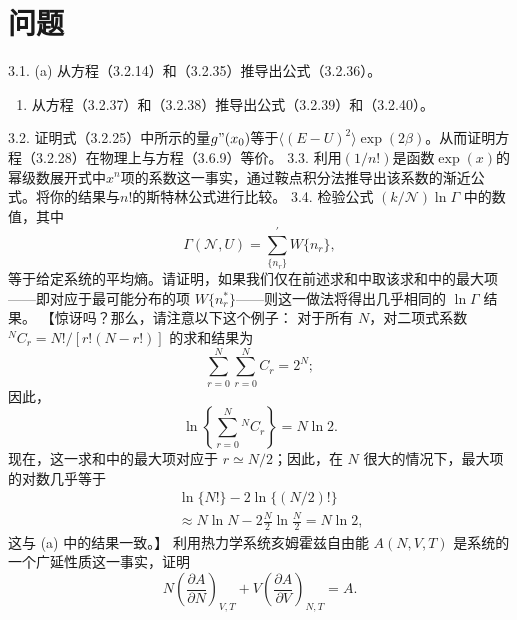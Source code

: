 \section{问题}\label{ux95eeux9898_chap3}
3.1. (a) 从方程（3.2.14）和（3.2.35）推导出公式（3.2.36）。
\begin{enumerate}
\def\labelenumi{(\alph{enumi})}
\setcounter{enumi}{1}
\item
  从方程（3.2.37）和（3.2.38）推导出公式（3.2.39）和（3.2.40）。
\end{enumerate}
3.2. 证明式（3.2.25）中所示的量\(g"(x_0)\)等于\(\langle (E-U)^2 \rangle \exp(2\beta)\)。从而证明方程（3.2.28）在物理上与方程（3.6.9）等价。
3.3. 利用\((1/n!)\)是函数\(\exp(x)\)的幂级数展开式中\(x^n\)项的系数这一事实，通过鞍点积分法推导出该系数的渐近公式。将你的结果与\(n!\)的斯特林公式进行比较。
3.4. 检验公式 \((k/\mathcal{N})\ln\Gamma\) 中的数值，其中
\begin{equation}\tag{3.5.117}\label{eq:3.5.117}
\Gamma ( \mathcal { N } , U ) = \sum _ { \{ n _ { r } \} } ^{\prime} W \{ n _ { r } \} ,
\end{equation}
等于给定系统的平均熵。请证明，如果我们仅在前述求和中取该求和中的最大项——即对应于最可能分布的项 \(W\{n_r^*\}\)——则这一做法将得出几乎相同的 \(\ln\Gamma\) 结果。
【惊讶吗？那么，请注意以下这个例子：
对于所有 \(N\)，对二项式系数 \(^{N}C_{r}=N!/[r!(N-r!)]\) 的求和结果为
\begin{equation}\tag{3.5.118}\label{eq:3.5.118}
\sum _ { r = 0 } ^{N} \sum _ { r = 0 } ^{N} C _ { r } = 2 ^{N} ;
\end{equation}
因此，
\begin{equation}\tag{3.5.119}\label{eq:3.5.119}
\ln \left\{ \sum _ { r = 0 } ^{N} { } ^{N} C _ { r } \right\} = N \ln 2 .
\end{equation}
现在，这一求和中的最大项对应于 \(r \simeq N/2\)；因此，在 \(N\) 很大的情况下，最大项的对数几乎等于
\begin{equation}\tag{3.5.120}\label{eq:3.5.120}
\begin{array}{rlr} & { } & { \ln \{ N ! \} - 2 \ln \{ ( N / 2 ) ! \} } \\& { } & { \approx N \ln N - 2 \frac { N } { 2 } \ln \frac { N } { 2 } = N \ln 2 , } \end{array}
\end{equation}
这与 (a) 中的结果一致。】
利用热力学系统亥姆霍兹自由能 \(A(N,V,T)\) 是系统的一个广延性质这一事实，证明
\begin{equation}\tag{3.5.121}\label{eq:3.5.121}
N  \left( \frac { \partial A } { \partial N } \right) _ { V , T } + V  \left( \frac { \partial A } { \partial V } \right) _ { N , T } = A .
\end{equation}
